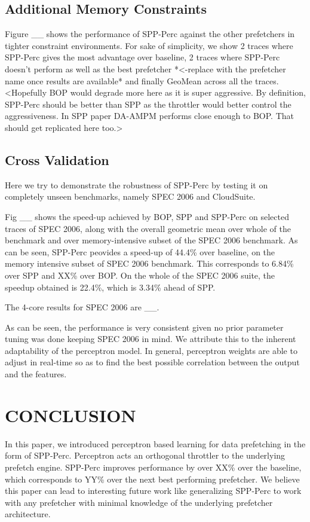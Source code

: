 \documentclass{sig-alternate}
\begin{document}
\subsection{Additional Memory Constraints}
Figure \_\_ shows the performance of SPP-Perc against the other prefetchers in tighter constraint environments. 
For sake of simplicity, we show 2 traces where SPP-Perc gives the most advantage over baseline, 2 traces where SPP-Perc doesn't perform as well as the best prefetcher *<-replace with the prefetcher name once results are available* and finally GeoMean across all the traces. 
<Hopefully BOP would degrade more here as it is super aggressive. 
By definition, SPP-Perc should be better than SPP as the throttler would better control the aggressiveness. 
In SPP paper DA-AMPM performs close enough to BOP. That should get replicated here too.>

\subsection{Cross Validation}
Here we try to demonstrate the robustness of SPP-Perc by testing it on completely unseen benchmarks, namely SPEC 2006 and CloudSuite.

Fig \_\_ shows the speed-up achieved by BOP, SPP and SPP-Perc on selected traces of SPEC 2006, along with the overall geometric mean over whole of the benchmark and over memory-intensive subset of the SPEC 2006 benchmark.
As can be seen, SPP-Perc peovides a speed-up of 44.4\% over baseline, on the memory intensive subset of SPEC 2006 benchmark.
This corresponds to 6.84\% over SPP and XX\% over BOP.
On the whole of the SPEC 2006 suite, the speedup obtained is 22.4\%, which is 3.34\% ahead of SPP.

The 4-core results for SPEC 2006 are \_\_.

As can be seen, the performance is very consistent given no prior parameter tuning was done keeping SPEC 2006 in mind. 
We attribute this to the inherent adaptability of the perceptron model.
In general, perceptron weights are able to adjust in real-time so as to find the best possible correlation between the output and the features.

\section{CONCLUSION}
In this paper, we introduced perceptron based learning for data prefetching in the form of SPP-Perc. 
Perceptron acts an orthogonal throttler to the underlying prefetch engine. 
SPP-Perc improves performance by over XX\% over the baseline, which corresponds to YY\% over the next best performing prefetcher. 
We believe this paper can lead to interesting future work like generalizing SPP-Perc to work with any prefetcher with minimal knowledge of the underlying prefetcher architecture.


\end{document}
